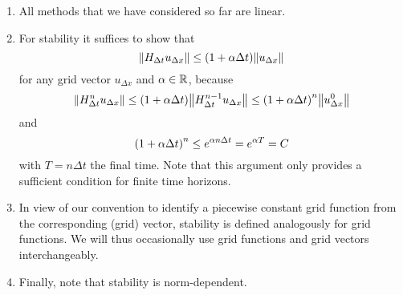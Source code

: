 \begin{remark}
	\begin{enumerate}
		\item All methods that we have considered so far are linear.
		\item For stability it suffices to show that
		\[
			\norm*{H_{\Delta t}u_{\Delta x}} \le \parentheses*{1 + \alpha\Delta t}\norm*{u_{\Delta x}}
		\]
		for any grid vector \(u_{\Delta x}\) and \(\alpha \in \R\), because
		\[
			\norm*{H_{\Delta t}^n u_{\Delta x}} \le \parentheses*{1 + \alpha\Delta t}\norm*{H_{\Delta t}^{n - 1}u_{\Delta x}} \le \parentheses*{1 + \alpha\Delta t}^n \norm*{u_{\Delta x}^0}
		\]
		and
		\[
			\parentheses*{1 + \alpha\Delta t}^n \le e^{\alpha n\Delta t} = e^{\alpha T} = C
		\]
		with \(T = n\Delta t\) the final time.
		Note that this argument only provides a sufficient condition for finite time horizons.
		\item In view of our convention to identify a piecewise constant grid function from the corresponding (grid) vector, stability is defined analogously for grid functions.
		We will thus occasionally use grid functions and grid vectors interchangeably.
		\item Finally, note that stability is norm-dependent.
	\end{enumerate}
\end{remark}

